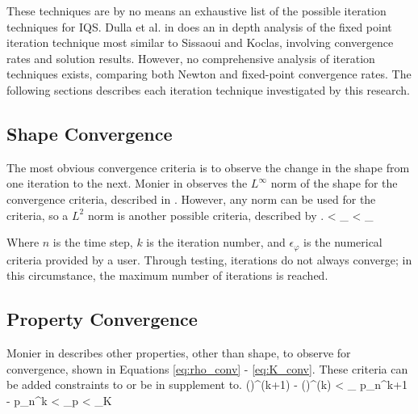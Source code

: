 These techniques are by no means an exhaustive list of the possible iteration techniques for IQS. Dulla et al. in \cite{Dulla2008} does an in depth analysis of the fixed point iteration technique most similar to Sissaoui and Koclas, involving convergence rates and solution results.  However, no comprehensive analysis of iteration techniques exists, comparing both Newton and fixed-point convergence rates.  The following sections describes each iteration technique investigated by this research.

\subsection{Shape Convergence}

The most obvious convergence criteria is to observe the change in the shape from one iteration to the next.  Monier in \cite{Monier_diss} observes the $L^{\infty}$ norm of the shape for the convergence criteria, described in .  However, any norm can be used for the criteria, so a $L^2$ norm is another possible criteria, described by .
\be
{} < \epsilon_{\varphi}
\label{eq:shape_Linf}
\ee 
\be
{} < \epsilon_{\varphi}
\label{eq:shape_L2}
\ee 

Where $n$ is the time step, $k$ is the iteration number, and $\epsilon_{\varphi}$ is the numerical criteria provided by a user. Through testing, iterations do not always converge; in this circumstance, the maximum number of iterations is reached.


\subsection{Property Convergence}

Monier in \cite{Monier_diss} describes other properties, other than shape, to observe for convergence, shown in Equations \eqref{eq:rho_conv} - \eqref{eq:K_conv}.  These criteria can be added constraints to  or be in supplement to.
\be
\left(\frac{\rho}{\Lambda}\right)^{(k+1)} - \left(\frac{\rho}{\Lambda}\right)^{(k)} < \epsilon_{\rho}
\label{eq:rho_conv}
\ee
\be 
p_n^{k+1} - p_n^{k} < \epsilon_p
\label{eq:p_conv}
\ee
\be 
{} < \epsilon_K
\label{eq:K_conv}
\ee

